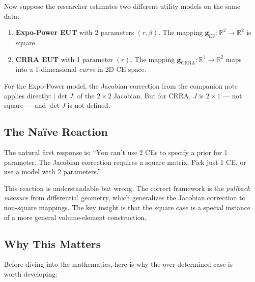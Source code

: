 \documentclass[11pt,a4paper]{article}
\theoremstyle{definition}
\begin{document}
Now suppose the researcher estimates two different utility models on the same
data:
\begin{enumerate}
    \item \textbf{Expo-Power EUT} with 2 parameters $(r, \beta)$. The mapping
    $\mathbf{g}_{\text{EP}}: \mathbb{R}^2 \to \mathbb{R}^2$ is square.
    \item \textbf{CRRA EUT} with 1 parameter $(r)$. The mapping
    $\mathbf{g}_{\text{CRRA}}: \mathbb{R}^1 \to \mathbb{R}^2$ maps into a
    1-dimensional \emph{curve} in 2D CE space.
\end{enumerate}

For the Expo-Power model, the Jacobian correction from the companion note
applies directly: $|\!\det J|$ of the $2 \times 2$ Jacobian. But for CRRA,
$J$ is $2 \times 1$ --- not square --- and $\det J$ is not defined.

\subsection{The Na\"ive Reaction}

The natural first response is: ``You can't use 2 CEs to specify a prior for 1
parameter. The Jacobian correction requires a square matrix. Pick just 1 CE, or
use a model with 2 parameters.''

This reaction is understandable but wrong. The correct framework is the
\emph{pullback measure} from differential geometry, which generalizes the
Jacobian correction to non-square mappings. The key insight is that the square
case is a special instance of a more general volume-element construction.

\subsection{Why This Matters}

Before diving into the mathematics, here is why the over-determined case is
worth developing:
\end{document}
